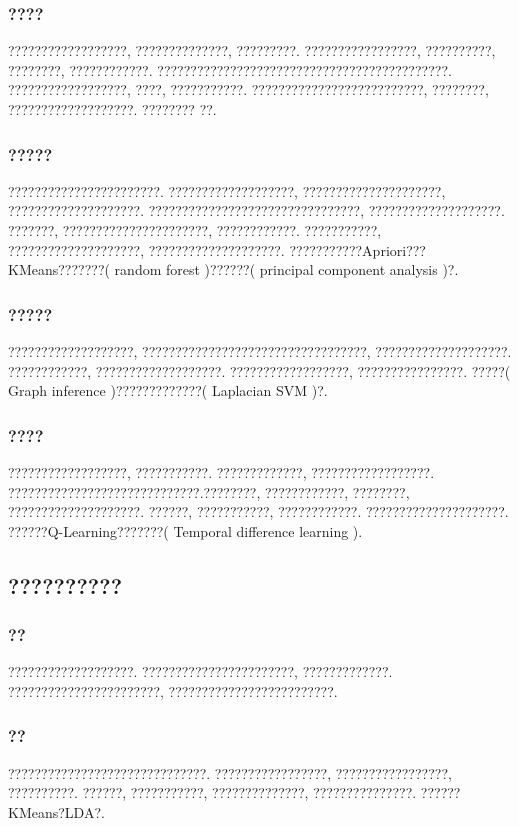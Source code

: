 \documentclass[lang=cn,11pt,a4paper]{elegantpaper}
\begin{document}
\subsubsection*{????}
??????????????????, ??????????????, ?????????. ?????????????????, ??????????, ????????, ????????????. ????????????????????????????????????????????. ??????????????????, ????, ???????????. ??????????????????????????, ????????, ???????????????????. ???????? ??. 
\subsubsection*{?????}
???????????????????????. ???????????????????, ?????????????????????, ????????????????????. ????????????????????????????????, ????????????????????. ???????, ??????????????????????, ????????????. ???????????, ????????????????????, ????????????????????. ???????????Apriori???KMeans???????( random forest )??????( principal component analysis )?. 

\subsubsection*{?????}
???????????????????, ??????????????????????????????????, ????????????????????. ????????????, ???????????????????. ??????????????????, ????????????????. ?????( Graph inference )?????????????( Laplacian SVM )?. 
\subsubsection*{????}
??????????????????, ???????????. ?????????????, ??????????????????. ?????????????????????????????.????????, ????????????, ????????, ????????????????????. ??????, ???????????, ????????????. ?????????????????????. ??????Q-Learning???????( Temporal difference learning ). 
\subsection{??????????}
\subsubsection*{??}
???????????????????. ???????????????????????, ?????????????. ???????????????????????, ?????????????????????????. 
\subsubsection*{??}
??????????????????????????????. ?????????????????, ?????????????????, ??????????. ??????, ???????????, ??????????????, ???????????????. ??????KMeans?LDA?. 
\end{document}
